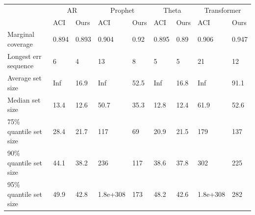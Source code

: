 \begin{tabular}{lllllllll}
\toprule
& \multicolumn{2}{c}{AR}& \multicolumn{2}{c}{Prophet}& \multicolumn{2}{c}{Theta}& \multicolumn{2}{c}{Transformer} \\
& ACI & Ours & ACI & Ours & ACI & Ours & ACI & Ours \\
\midrule
Marginal coverage & 0.894 & 0.893 & 0.904 & 0.92 & 0.895 & 0.89 & 0.906 & 0.947 \\
Longest err sequence & 6 & 4 & 13 & 8 & 5 & 5 & 21 & 12 \\
Average set size & Inf & 16.9 & Inf & 52.5 & Inf & 16.8 & Inf & 91.1 \\
Median set size & 13.4 & 12.6 & 50.7 & 35.3 & 12.8 & 12.4 & 61.9 & 52.6 \\
75\% quantile set size & 28.4 & 21.7 & 117 & 69 & 20.9 & 21.5 & 179 & 137 \\
90\% quantile set size & 44.1 & 38.2 & 236 & 117 & 38.6 & 37.8 & 302 & 225 \\
95\% quantile set size & 49.9 & 42.8 & 1.8e+308 & 173 & 48.2 & 42.6 & 1.8e+308 & 282 \\
\bottomrule
\end{tabular}

